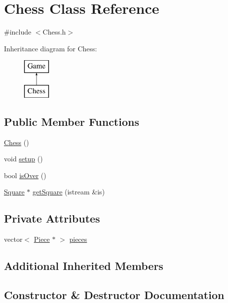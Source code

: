 \hypertarget{classChess}{}\section{Chess Class Reference}
\label{classChess}


{\ttfamily \#include $<$Chess.\+h$>$}

Inheritance diagram for Chess\+:\begin{figure}[H]
\begin{center}
\leavevmode
\includegraphics[height=2.000000cm]{classChess}
\end{center}
\end{figure}
\subsection*{Public Member Functions}
\begin{DoxyCompactItemize}
\item 
\hyperlink{classChess_a8b493f742d0ceced6f853fa30d3c05a8}{Chess} ()
\item 
void \hyperlink{classChess_a9722d5c13c442eae33ca17792996213a}{setup} ()
\item 
bool \hyperlink{classChess_ac85e41b8580d3300185bd2bc264ec6d8}{is\+Over} ()
\item 
\hyperlink{classSquare}{Square} $\ast$ \hyperlink{classChess_a8266d0da94f72df7991799790915e38b}{get\+Square} (istream \&is)
\end{DoxyCompactItemize}
\subsection*{Private Attributes}
\begin{DoxyCompactItemize}
\item 
vector$<$ \hyperlink{classPiece}{Piece} $\ast$ $>$ \hyperlink{classChess_af1095b2af2920e5d12cf133dd88cf30e}{pieces}
\end{DoxyCompactItemize}
\subsection*{Additional Inherited Members}


\subsection{Constructor \& Destructor Documentation}
\hypertarget{classChess_a8b493f742d0ceced6f853fa30d3c05a8}{}
